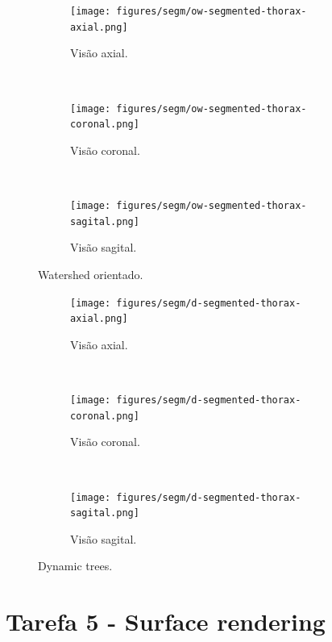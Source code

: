 \documentclass{article}
\begin{document}
\begin{figure}[H]
    \centering
    \begin{subfigure}[b]{0.3\textwidth}
        \texttt{[image: figures/segm/ow-segmented-thorax-axial.png]}
        \caption{Visão axial.}
    \end{subfigure}
    ~
    \begin{subfigure}[b]{0.3\textwidth}
        \texttt{[image: figures/segm/ow-segmented-thorax-coronal.png]}
        \caption{Visão coronal.}
    \end{subfigure}
    ~
    \begin{subfigure}[b]{0.3\textwidth}
        \texttt{[image: figures/segm/ow-segmented-thorax-sagital.png]}
        \caption{Visão sagital.}
    \end{subfigure}

    \caption{Watershed orientado.}
    \label{fig:o-watershed}
\end{figure}

\begin{figure}[H]
    \centering
    \begin{subfigure}[b]{0.3\textwidth}
        \texttt{[image: figures/segm/d-segmented-thorax-axial.png]}
        \caption{Visão axial.}
    \end{subfigure}
    ~
    \begin{subfigure}[b]{0.3\textwidth}
        \texttt{[image: figures/segm/d-segmented-thorax-coronal.png]}
        \caption{Visão coronal.}
    \end{subfigure}
    ~
    \begin{subfigure}[b]{0.3\textwidth}
        \texttt{[image: figures/segm/d-segmented-thorax-sagital.png]}
        \caption{Visão sagital.}
    \end{subfigure}

    \caption{Dynamic trees.}
    \label{fig:dynamic}
\end{figure}

\section{Tarefa 5 - Surface rendering}
\end{document}
